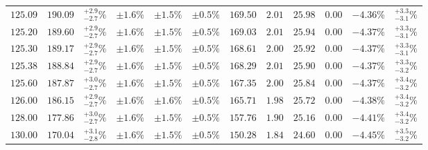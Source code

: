 \begin{landscape}
\begin{table}[ht!]
{\begin{tabular}{| cc | c | ccc | ccccc | c |}
$125.09$ & $190.09$ & $^{+2.9}_{-2.7}\%$ & $\pm 1.6\%$ & {\color{black!55}$\pm 1.5\%$} & {\color{black!55}$\pm 0.5\%$} & $169.50$ & $2.01$ & $25.98$ & $0.00$ & $-4.36\%$ & $^{+3.3}_{-3.1}\%$ \\
$125.20$ & $189.60$ & $^{+2.9}_{-2.7}\%$ & $\pm 1.6\%$ & {\color{black!55}$\pm 1.5\%$} & {\color{black!55}$\pm 0.5\%$} & $169.03$ & $2.01$ & $25.94$ & $0.00$ & $-4.37\%$ & $^{+3.3}_{-3.1}\%$ \\
$125.30$ & $189.17$ & $^{+2.9}_{-2.7}\%$ & $\pm 1.6\%$ & {\color{black!55}$\pm 1.5\%$} & {\color{black!55}$\pm 0.5\%$} & $168.61$ & $2.00$ & $25.92$ & $0.00$ & $-4.37\%$ & $^{+3.3}_{-3.1}\%$ \\
$125.38$ & $188.84$ & $^{+2.9}_{-2.7}\%$ & $\pm 1.6\%$ & {\color{black!55}$\pm 1.5\%$} & {\color{black!55}$\pm 0.5\%$} & $168.29$ & $2.01$ & $25.90$ & $0.00$ & $-4.37\%$ & $^{+3.3}_{-3.2}\%$ \\
$125.60$ & $187.87$ & $^{+3.0}_{-2.7}\%$ & $\pm 1.6\%$ & {\color{black!55}$\pm 1.5\%$} & {\color{black!55}$\pm 0.5\%$} & $167.35$ & $2.00$ & $25.84$ & $0.00$ & $-4.37\%$ & $^{+3.4}_{-3.2}\%$ \\
$126.00$ & $186.15$ & $^{+2.9}_{-2.7}\%$ & $\pm 1.6\%$ & {\color{black!55}$\pm 1.6\%$} & {\color{black!55}$\pm 0.5\%$} & $165.71$ & $1.98$ & $25.72$ & $0.00$ & $-4.38\%$ & $^{+3.4}_{-3.2}\%$ \\
$128.00$ & $177.86$ & $^{+3.0}_{-2.7}\%$ & $\pm 1.6\%$ & {\color{black!55}$\pm 1.5\%$} & {\color{black!55}$\pm 0.5\%$} & $157.76$ & $1.90$ & $25.16$ & $0.00$ & $-4.41\%$ & $^{+3.4}_{-3.2}\%$ \\
$130.00$ & $170.04$ & $^{+3.1}_{-2.8}\%$ & $\pm 1.6\%$ & {\color{black!55}$\pm 1.5\%$} & {\color{black!55}$\pm 0.5\%$} & $150.28$ & $1.84$ & $24.60$ & $0.00$ & $-4.45\%$ & $^{+3.5}_{-3.2}\%$ \\
\cline{1-12}
\end{tabular}
}
\end{table}



\end{landscape}
